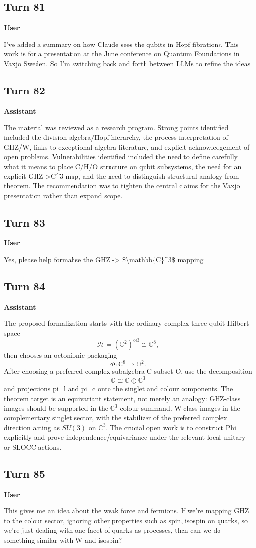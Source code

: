 \documentclass[11pt,a4paper]{article}
\newcommand{\speaker}[1]{\par\medskip\noindent\textbf{\large #1}\par\smallskip}
\begin{document}
\subsection*{Turn 81}
\speaker{User}
I've added a summary on how Claude sees the qubits in Hopf fibrations. This work is for a presentation at the June conference on Quantum Foundations in Vaxjo Sweden. So I'm switching back and forth between LLMs to refine the ideas
\subsection*{Turn 82}
\speaker{Assistant}
The material was reviewed as a research program. Strong points identified included the division-algebra/Hopf hierarchy, the process interpretation of GHZ/W, links to exceptional algebra literature, and explicit acknowledgement of open problems. Vulnerabilities identified included the need to define carefully what it means to place C/H/O structure on qubit subsystems, the need for an explicit GHZ->C\textasciicircum{}3 map, and the need to distinguish structural analogy from theorem. The recommendation was to tighten the central claims for the Vaxjo presentation rather than expand scope.
\subsection*{Turn 83}
\speaker{User}
Yes, please help formalise the GHZ -> \$\textbackslash{}mathbb\{C\}\textasciicircum{}3\$ mapping
\subsection*{Turn 84}
\speaker{Assistant}
The proposed formalization starts with the ordinary complex three-qubit Hilbert space
\[
\mathcal H=(\mathbb C^2)^{\otimes3}\cong\mathbb C^8,
\]
then chooses an octonionic packaging
\[
\Phi:\mathbb C^8\to\mathbb O^2.
\]
After choosing a preferred complex subalgebra C subset O, use the decomposition
\[
\mathbb O\cong\mathbb C\oplus\mathbb C^3
\]
and projections pi_l and pi_c onto the singlet and colour components. The theorem target is an equivariant statement, not merely an analogy: GHZ-class images should be supported in the $\mathbb C^3$ colour summand, W-class images in the complementary singlet sector, with the stabilizer of the preferred complex direction acting as $SU(3)$ on $\mathbb C^3$. The crucial open work is to construct Phi explicitly and prove independence/equivariance under the relevant local-unitary or SLOCC actions.
\subsection*{Turn 85}
\speaker{User}
This gives me an idea about the weak force and fermions. If we're mapping GHZ to the colour sector, ignoring other properties such as spin, isospin on quarks, so we're just dealing with one facet of quarks as processes, then can we do something similar with W and isospin?
\end{document}
